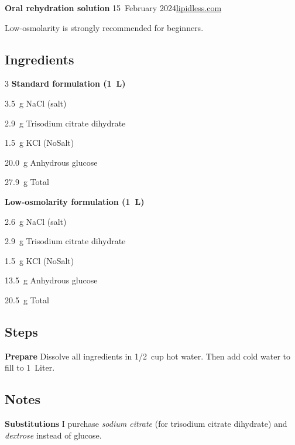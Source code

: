 \documentclass[
    fontsize=10pt,
    letterpaper,oneside,paper=portrait
]{scrartcl}
\newcommand{\myname}{lipidless.com}
\newcommand{\mydate}{15~February 2024}
\newcommand{\mytitle}{Oral rehydration solution}
\newcommand{\myurl}{https://www.lipidless.com/recipes/oral-rehydration-solution}
\newcommand{\paragrcompact}[1]{\textbf{\sffamily #1}\quad}
\begin{document}
{\sffamily \textbf{\LARGE \mytitle} \hfill \mydate \hfill \href{\myurl}{\myname}}

\vspace{\baselineskip}

Low-osmolarity is strongly recommended for beginners.

\subsection*{Ingredients}

{\setlength{\parskip}{0.25\baselineskip}\small

\begin{paracol}{3}
\textbf{Standard formulation (1~L)} \par
3.5~g NaCl (salt) \par
2.9~g Trisodium citrate dihydrate \par
1.5~g KCl (NoSalt) \par
20.0~g Anhydrous glucose \par
27.9~g Total \par
\switchcolumn
\textbf{Low-osmolarity formulation (1~L)} \par
2.6~g NaCl (salt) \par
2.9~g Trisodium citrate dihydrate \par
1.5~g KCl (NoSalt) \par
13.5~g Anhydrous glucose \par
20.5~g Total \par
\end{paracol}
}

\subsection*{Steps}

\paragrcompact{Prepare} Dissolve all ingredients in 1/2~cup hot water. Then add cold water to fill to 1~Liter.

\subsection*{Notes}

\paragrcompact{Substitutions} I purchase \textit{sodium citrate} (for trisodium citrate dihydrate) and \textit{dextrose} instead of glucose.
\end{document}
